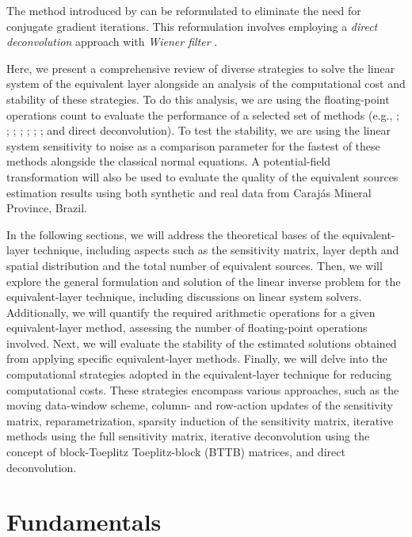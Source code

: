 \documentclass[utf8]{FrontiersinHarvard} %
\begin{document}
	The method introduced by \citet{takahashi-etal2020,takahashi-etal2022} can be reformulated to eliminate the need for conjugate gradient iterations. 
	This reformulation involves employing a \textit{direct deconvolution} approach \citep[e.g.,][p. 220]{aster_etal2019} with 
	\textit{Wiener filter} \citep[e.g.,][p. 263]{gonzalez-woods2002}.
	
	Here, we present a comprehensive review of diverse strategies to solve the linear system of the equivalent layer alongside an analysis 
	of the computational cost and stability of these strategies. 
	To do this analysis, we are using the floating-point operations count to evaluate the performance of 
	a selected set of methods (e.g., \cite{leao-silva1989};  \cite{cordell1992};
	\cite{oliveirajr-etal2013}; \cite{siqueira-etal2017}; \cite{mendonca2020}; \cite{takahashi-etal2020}; 
	\cite{soler-uieda2021}; and direct deconvolution). 
	To test the stability, we are using the linear system sensitivity to noise as a comparison parameter for the fastest of these methods alongside the classical normal equations. 
	A potential-field transformation will also be used to evaluate the quality of the equivalent sources estimation results using both synthetic and real data from Carajás Mineral Province, Brazil.
	
	In the following sections, we will address the theoretical bases of the equivalent-layer technique, including aspects such as the sensitivity matrix, layer depth and spatial distribution and the total number of equivalent sources. 
	Then, we will explore the general formulation and solution of the linear inverse problem for the equivalent-layer technique, including discussions on linear system solvers. 
	Additionally, we will quantify the required arithmetic operations for a given equivalent-layer method, assessing the number of floating-point operations involved. 
	Next, we will evaluate the stability of the estimated solutions obtained from applying specific equivalent-layer methods.
	Finally, we will delve into the computational strategies adopted in the equivalent-layer technique for reducing computational costs. 
	These strategies encompass various approaches, such as the moving data-window scheme, column- and row-action updates of the sensitivity matrix, reparametrization, sparsity induction of the sensitivity matrix, iterative methods using the full sensitivity matrix, iterative deconvolution using the concept of block-Toeplitz Toeplitz-block (BTTB) matrices, and direct deconvolution.
	
	\section{Fundamentals}
	
\end{document}
